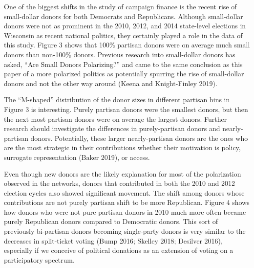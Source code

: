 \documentclass[12pt,]{article}
\begin{document}
One of the biggest shifts in the study of campaign finance is the recent
rise of small-dollar donors for both Democrats and Republicans. Although
small-dollar donors were not as prominent in the 2010, 2012, and 2014
state-level elections in Wisconsin as recent national politics, they
certainly played a role in the data of this study. Figure 3 shows that
100\% partisan donors were on average much small donors than non-100\%
donors. Previous research into small-dollar donors has asked, ``Are
Small Donors Polarizing?'' and came to the same conclusion as this paper
of a more polarized politics as potentially spurring the rise of
small-dollar donors and not the other way around (Keena and
Knight-Finley 2019).

The ``M-shaped'' distribution of the donor sizes in different partisan
bins in Figure 3 is interesting. Purely partisan donors were the
smallest donors, but then the next most partisan donors were on average
the largest donors. Further research should investigate the differences
in purely-partisan donors and nearly-partisan donors. Potentially, these
larger nearly-partisan donors are the ones who are the most strategic in
their contributions whether their motivation is policy, surrogate
representation (Baker 2019), or access.

Even though new donors are the likely explanation for most of the
polarization observed in the networks, donors that contributed in both
the 2010 and 2012 election cycles also showed significant movement. The
shift among donors whose contributions are not purely partisan shift to
be more Republican. Figure 4 shows how donors who were not pure partisan
donors in 2010 much more often became purely Republican donors compared
to Democratic donors. This sort of previously bi-partisan donors
becoming single-party donors is very similar to the decreases in
split-ticket voting (Bump 2016; Skelley 2018; Desilver 2016), especially
if we conceive of political donations as an extension of voting on a
participatory spectrum.
\end{document}
